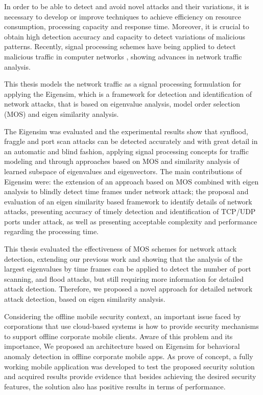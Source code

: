 In order to be able to detect and avoid novel attacks and their variations, it is necessary to develop or improve techniques to achieve efficiency on resource consumption, processing capacity and response time. Moreover, it is crucial to obtain high detection accuracy and capacity to detect variations of malicious patterns. Recently, signal processing schemes have being applied to detect malicious traffic in computer networks \cite{Lu2009,Huang2009,Zonglin2009,david2011blind,da2012improved,tenorio2013greatest, vieira2017model}, showing advances in network traffic analysis.

This thesis models the network traffic as a signal processing formulation for applying the Eigensim, which is a framework for detection and identification of network attacks, that is based on eigenvalue analysis, model order selection (MOS) and eigen similarity analysis.

The Eigensim was evaluated and the experimental results show that synflood, fraggle and port scan attacks can be detected accurately and with great detail in an automatic and blind fashion, applying signal processing concepts for traffic modeling and through approaches based on MOS and similarity analysis of learned subspace of eigenvalues and eigenvectors. The main contributions of Eigensim were: the extension of an approach based on MOS combined with eigen analysis to blindly detect time frames under network attack; the proposal and evaluation of an eigen similarity based framework to identify details of network attacks, presenting accuracy of timely detection and identification of TCP/UDP ports under attack, as well as presenting acceptable complexity and performance regarding the processing time.

This thesis evaluated the effectiveness of MOS schemes for network attack detection, extending our previous work \cite{tenorio2013greatest} and showing that the analysis of the largest eigenvalues by time frames can be applied to detect the number of port scanning, and flood attacks, but still requiring more information for detailed attack detection. Therefore, we proposed a novel approach for detailed network attack detection, based on eigen similarity analysis.

Considering the offline mobile security context, an important issue faced by corporations that use cloud-based systems is how to provide security mechanisms to support offline corporate mobile clients. Aware of this problem and its importance, We proposed an architecture based on Eigensim for behavioral anomaly detection in offline corporate mobile apps. As prove of concept, a fully working mobile application was developed to test the proposed security solution and acquired results provide evidence that besides achieving the desired security features, the solution also has positive results in terms of performance. 

